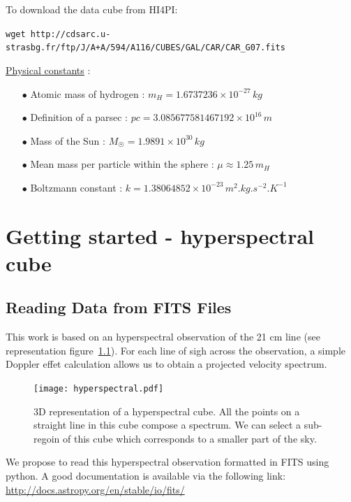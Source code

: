 \documentclass[a4paper,10.5pt]{report}
\begin{document}
To download the data cube from HI4PI:


\verb|wget http://cdsarc.u-strasbg.fr/ftp/J/A+A/594/A116/CUBES/GAL/CAR/CAR_G07.fits|

\newpage
\noindent
\underline{Physical constants} : \\
\begin{itemize}
\item[$\bullet$] Atomic mass of hydrogen : $m_H = 1.6737236 \times 10^{-27} \, kg$
\item[$\bullet$] Definition of a parsec : $pc = 3.085677581467192 \times 10^{16} \, m$
\item[$\bullet$] Mass of the Sun : $M_{\astrosun} = 1.9891 \times 10^{30} \, kg$
\item[$\bullet$] Mean mass per particle within the sphere : $\mu \approx 1.25 \, m_H$
\item[$\bullet$] Boltzmann constant : $k = 1.38064852 \times 10^{-23} \, m^2.kg.s^{-2}.K^{-1}$
\end{itemize}

\chapter{Getting started - hyperspectral cube}
\section{Reading Data from FITS Files}
This work is based on an hyperspectral observation of the 21 cm line
(see representation figure~\ref{fig::hyperspectral}). For each line of sigh across the observation, a simple Doppler effet
calculation allows us to obtain a projected velocity spectrum. \\

\begin{figure}[h!]
  \centering
  \texttt{[image: hyperspectral.pdf]}
  \label{fig::hyperspectral}
  \caption{3D representation of a hyperspectral cube. All the points on a straight line in this cube compose a spectrum.
  We can select a sub-regoin of this cube which corresponds to a smaller part of the sky.}
\end{figure}

We propose to read this hyperspectral observation formatted in FITS using python.
A good documentation is available via the following link:
\color{blue} \url{http://docs.astropy.org/en/stable/io/fits/} \color{black}
\end{document}
